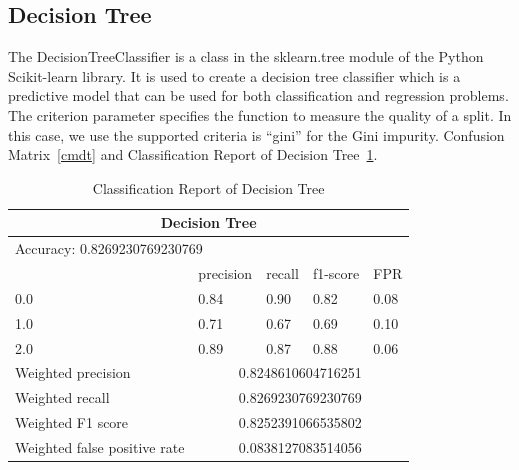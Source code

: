 \subsection{Decision Tree} 

The DecisionTreeClassifier is a class in the sklearn.tree module of the Python Scikit-learn library. It is used to create a decision tree classifier which is a predictive model that can be used for both classification and regression problems. The criterion parameter specifies the function to measure the quality of a split. In this case, we use the supported criteria is “gini” for the Gini impurity.
Confusion Matrix~\ref{cmdt} and Classification Report of Decision Tree~\ref{tabledt}.
\begin{table}[H]\centering
    \begin{tabular}{@{}lllll@{}}
    \toprule
    \multicolumn{5}{c}{Decision Tree}                 \\ \midrule
    \multicolumn{5}{l}{Accuracy: 0.8269230769230769}       \\\midrule
                 & precision & recall & f1-score & FPR \\
    0.0         & 0.84      & 0.90   & 0.82     & 0.08      \\ 
    1.0          & 0.71      & 0.67   & 0.69     & 0.10     \\
    2.0       & 0.89      & 0.87   & 0.88     & 0.06     \\
    
    Weighted precision    & \multicolumn{4}{c}{0.8248610604716251}         \\
    Weighted recall    & \multicolumn{4}{c}{0.8269230769230769}          \\
    Weighted F1 score    & \multicolumn{4}{c}{0.8252391066535802}        \\
    Weighted false positive rate & \multicolumn{4}{c}{0.0838127083514056}  \\ \bottomrule
    \end{tabular}
    \caption{Classification Report of Decision Tree}
    \label{tabledt}
    \end{table}

